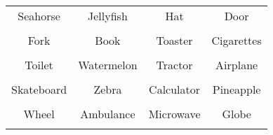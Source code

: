 \documentclass[12pt,a4paper]{article}
\begin{document}
\thispagestyle{empty}
\begin{table}[]
\centering
\Huge
\begin{tabular}{cccc}
 Seahorse& Jellyfish& Hat& Door\\  & & & \\
 Fork& Book& Toaster& Cigarettes\\  & & & \\
 Toilet& Watermelon& Tractor& Airplane\\  & & & \\
 Skateboard& Zebra& Calculator& Pineapple\\  & & & \\
 Wheel& Ambulance& Microwave& Globe\\  & & & \\
\end{tabular}
\end{table}
\end{document}

